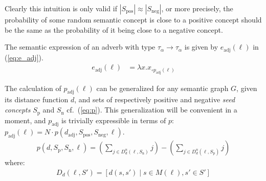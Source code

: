 Clearly this intuition is only valid if $|S_\mathrm{pos}| \approx |S_\mathrm{neg}|$, or more precisely, the probability of some random semantic concept is close to a positive concept should be the same as the probability of it being close to a negative concept. %

The semantic expression of an adverb with type $\tau_\alpha \to \tau_\alpha$ is given by $e_\mathrm{adj}(\ell)$ in (\ref{eq:e_adj}).
\begin{align}
	e_\mathrm{adj}(\ell) &=
    \lambda x . x_{\circ p_\mathrm{adj}(\ell)}
	\label{eq:e_adj}
\end{align}

The calculation of $p_\mathrm{adj}(\ell)$ can be generalized for any semantic graph $G$, given its distance function $d$, and sets of respectively positive and negative \emph{seed concepts} $S_\mathrm{p}$ and $S_\mathrm{n}$ cf.\ (\ref{eq:p}). This generalization will be convenient in a moment, and $p_\mathrm{adj}$ is trivially expressible in terms of $p$: $p_\mathrm{adj}(\ell) = N \cdot p(d_\mathrm{adj}, S_\mathrm{pos}, S_\mathrm{neg}, \ell)$.
\begin{align}
    p(d, S_\mathrm{p}, S_\mathrm{n}, \ell) =     	
    	\left( \sum_{j \in  D_d^n(\ell, S_\mathrm{n}) } j \right) -
		\left( \sum_{j \in  D_d^n(\ell, S_\mathrm{p}) } j \right)	
	\label{eq:p}
\end{align}
where:
\begin{align}
	D_d(\ell, S') = \left[ d(s, s') \; | \; s \in M(\ell), s' \in S' \right] 
	\label{eq:p}
\end{align}


